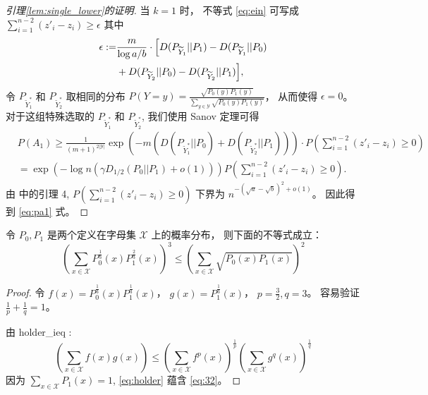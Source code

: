         \begin{proof}[引理\ref{lem:single_lower}的证明] 
当 $k=1$ 时，
不等式 \eqref{eq:ein} 可写成
$\sum_{i=1}^{n-2} (z'_i - z_i)
\geq \epsilon$
其中
\begin{align*}
\epsilon := &\frac{m}{\log a/b}\cdot 
\Bigl[D(P_{\widetilde{Y}_{1}} || P_1) 
- D(P_{\widetilde{Y}_{1}} || P_0) \\
&+D(P_{\widetilde{Y}_{2}} || P_0) -
D(P_{\widetilde{Y}_{2}} || P_1)\Bigr],
\end{align*}
令 $P_{\widetilde{Y}^{*}_1}$
和 $P_{\widetilde{Y}^{*}_2}$
取相同的分布
$P(Y=y)=\frac{\sqrt{P_0(y)P_1(y)}}
{ \sum_{y\in \mathcal{Y}}
\sqrt{P_0(y) P_1(y)}} $，
从而使得 $\epsilon =0$。
对于这组特殊选取的
$P_{\widetilde{Y}^{*}_1}$
和 $P_{\widetilde{Y}^{*}_2}$,
我们使用 Sanov 定理可得
\begin{align*}
&P(A_1)
\geq\frac{1}
{(m+1)^{2|\mathcal{Y}|}}
\exp \left(-m(D(P_{\widetilde{Y}^*_1} || P_0)
+ D(P_{\widetilde{Y}^*_2} || P_1))
\right)
\cdot P\left(\sum_{i=1}^{n-2} (z'_i - z_i) \geq 0\right)\\
& = \exp(-\log n (\gamma D_{1/2}(P_0||P_1)+o(1))) P(\sum_{i=1}^{n-2} (z'_i - z_i) \geq 0).
\end{align*}
由 \citet{abbe2015exact}
中的引理 4,
$P(\sum_{i=1}^{n-2} (z'_i - z_i) \geq 0)$ 下界为
 $n^{-(\sqrt{a} - \sqrt{b})^2 + o(1)}$。
因此得到 \eqref{eq:pa1} 式。
        \end{proof}

\begin{lemma}\label{lem:p0p1}
    令 $P_0,P_1$ 
    是两个定义在字母集
    $\mathcal{X}$ 上的概率分布，
    则下面的不等式成立：
    \begin{equation}\label{eq:32}
        \left(\sum_{x\in \mathcal{X}}
        P^{\frac{1}{3}}_0(x)
        P^{\frac{2}{3}}_1(x)\right)^3
        \leq \left(\sum_{x\in \mathcal{X}}
        \sqrt{P_0(x) P_1(x)}\right)^2
    \end{equation}
\end{lemma}

\begin{proof}
    令 $f(x)=P^{\frac{1}{3}}_0(x)
    P^{\frac{1}{3}}_1(x)$，
    $g(x) = P^{\frac{1}{3}}_1(x)$，
    $p=\frac{3}{2}, q=3$。
    容易验证 $\frac{1}{p} + \frac{1}{q}=1$。

    由 \gls{holder_ieq}
    :
    \begin{equation}\label{eq:holder}
        (\sum_{x\in\mathcal{X}}f(x)g(x))\leq (\sum_{x\in\mathcal{X}} f^p(x))^{\frac{1}{p}}
        (\sum_{x\in\mathcal{X}} g^q(x))^{\frac{1}{q}}
    \end{equation}
    因为 $\sum_{x\in\mathcal{X}} P_1(x)=1$, \eqref{eq:holder} 蕴含
    \eqref{eq:32}。
\end{proof}
    
